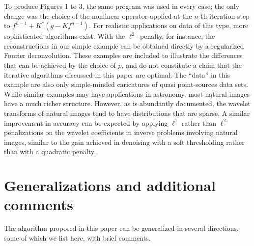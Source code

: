 \documentclass[10pt]{article}
\begin{document}
To produce Figures 1 to 3, the same program was used in every case; the only
change was the choice
of the nonlinear operator applied at the $n$-th iteration step to
$f^{n-1} + K^* (g - K f^{n-1})$.
For realistic applications on data of this type, more sophisticated algorithms
exist. With the
$\ell^2$--penalty, for instance, the reconstructions in our simple example
can be
obtained directly by a regularized Fourier deconvolution.
These examples are included to illustrate the differences
that can be achieved by the choice of $p$, and do not constitute a claim
that the
iterative algorithms discussed
in this paper are optimal. The ``data'' in this example are also only
simple-minded
caricatures of quasi
point-sources data sets. While similar examples may have applications in
astronomy,
most natural
images have a much richer structure. However, as is abundantly documented, the
wavelet transforms of
natural images tend to have distributions that are sparse. A similar
improvement in
accuracy can be expected by applying $\ell^1$ rather than $\ell^2$
penalizations on the
wavelet coefficients
in inverse problems involving natural images, similar to the gain achieved in
denoising with
a soft thresholding rather than with a quadratic penalty.

\section{Generalizations and additional comments}

The algorithm proposed in this paper can be generalized in several directions,
some of which we list here, with brief comments.
\end{document}
